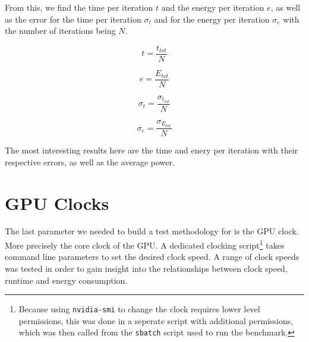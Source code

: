 From this, we find the time per iteration \( t \) and the energy per iteration \( e \), as well as the error for the time per iteration \( \sigma_t \) and for the energy per iteration \( \sigma_e \) with the number of iterations being \( N \).

\begin{equation}
t = \frac{t_{tot}}{N}
\end{equation}

\begin{equation}
e = \frac{E_{tot}}{N}
\end{equation}

\begin{equation}
\sigma_t = \frac{\sigma_{t_{tot}}}{N}
\end{equation}

\begin{equation}
\sigma_e = \frac{\sigma_{E_{tot}}}{N}
\end{equation}

The most interesting results here are the time and enery per iteration with their respective errors, as well as the average power.


\section{GPU Clocks}
The last parameter we needed to build a test methodology for is the GPU clock. More precisely the core clock of the GPU. A dedicated clocking script\footnote{Because using \texttt{nvidia-smi} to change the clock requires lower level permissions, this was done in a seperate script with additional permissions, which was then called from the \texttt{sbatch} script used to run the benchmark.} takes command line parameters to set the desired clock speed. A range of clock speeds was tested in order to gain insight into the relationships between clock speed, runtime and energy consumption.